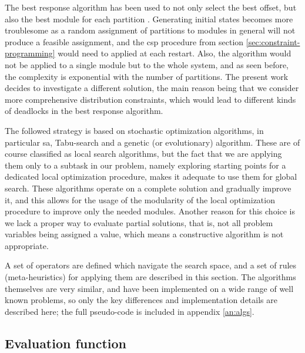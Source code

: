 \documentclass[main.tex]{subfiles}
\begin{document}
The best response algorithm has been used to not only select the best offset, but also the best module for each partition \cite{al2012strictly, pira2016line}.
Generating initial states becomes more troublesome as a random assignment of partitions to modules in general will not produce a feasible assignment, and the \gls{csp} procedure from section \ref{sec:constraint-programming} would need to applied at each restart.
Also, the algorithm would not be applied to a single module but to the whole system, and as seen before, the complexity is exponential with the number of partitions.
The present work decides to investigate a different solution, the main reason being that we consider more comprehensive distribution constraints, which would lead to different kinds of deadlocks in the best response algorithm.

The followed strategy is based on stochastic optimization algorithms, in particular \gls{sa}, Tabu-search and a genetic (or evolutionary) algorithm.
These are of course classified as local search algorithms, but the fact that we are applying them only to a subtask in our problem, namely exploring starting points for a dedicated local optimization procedure, makes it adequate to use them for global search.
These algorithms operate on a complete solution and gradually improve it, and this allows for the usage of the modularity of the local optimization procedure to improve only the needed modules.
Another reason for this choice is we lack a proper way to evaluate partial solutions, that is, not all problem variables being assigned a value, which means a constructive algorithm is not appropriate.

A set of operators are defined which navigate the search space, and a set of rules (meta-heuristics) for applying them are described in this section.
The algorithms themselves are very similar, and have been implemented on a wide range of well known problems, so only the key differences and implementation details are described here; the full pseudo-code is included in appendix \ref{an:algs}.


\subsection{Evaluation function}
\end{document}

